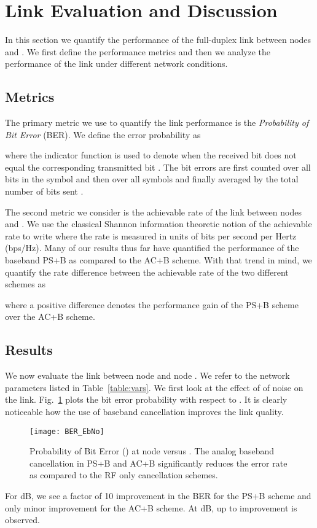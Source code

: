 \documentclass[12pt, journal,draftcls,letterpaper,onecolumn]{IEEEtran}
\begin{document}
\section{Link Evaluation and Discussion}
\label{sec:results}
In this section we quantify the performance of the full-duplex link between nodes  and .  We first define the performance metrics and then we analyze the performance of the link under different network conditions.  

\subsection{Metrics}
The primary metric we use to quantify the link performance is the \emph{Probability of Bit Error} (BER).  We define the error probability as

where the indicator function  is used to denote when the  received bit  does not equal the corresponding transmitted bit .  The bit errors are first counted over all  bits in the  symbol and then over all  symbols and finally averaged by the total number of bits sent .  

The second metric we consider is the achievable rate of the link between nodes  and .  We use the classical Shannon information theoretic notion \cite{cover_thomas} of the achievable rate to write  where the rate is measured in units of bits per second per Hertz (bps/Hz).  Many of our results thus far have quantified the performance of the baseband PS+B as compared to the AC+B scheme.  With that trend in mind, we quantify the rate difference between the achievable rate of the two different schemes as

where a positive difference denotes the performance gain of the PS+B scheme over the AC+B scheme.  

\subsection{Results}
We now evaluate the link between node  and node .  We refer to the network parameters listed in Table~\ref{table:vars}.  We first look at the effect of of noise on the link.  Fig.~\ref{fig:BER_EbNo} plots the bit error probability  with respect to .  It is clearly noticeable how the use of baseband cancellation improves the link quality.   
\begin{figure}[htp] 
\begin{center} 
  \texttt{[image: BER\_EbNo]}
\caption[fig:chan_ang]{Probability of Bit Error () at node  versus .  The analog baseband cancellation in PS+B and AC+B significantly reduces the error rate as compared to the RF only cancellation schemes.} 
  \label{fig:BER_EbNo}
\end{center} 
\end{figure}  
For  dB, we see a factor of 10 improvement in the BER for the PS+B scheme and only minor improvement for the AC+B scheme. At  dB, up to  improvement is observed.  
  
\end{document}
